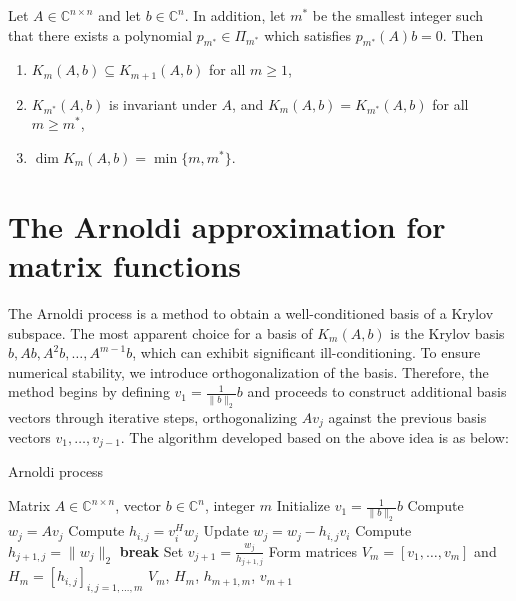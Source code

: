 \begin{remark}
    \label{rem:2.14}
    \cite{37} Let $A \in \mathbb{C}^{n \times n}$ and let $b \in \mathbb{C}^n$. In addition, let $m^*$ be the smallest integer such that there exists a polynomial $p_{m^*} \in \Pi_{m^*}$ which satisfies $p_{m^*}(A)b = 0$. Then
    \begin{enumerate}
        \item $K_m(A,b) \subseteq K_{m+1}(A,b)$ for all $m \geq 1$,
        \item $K_{m^*}(A,b)$ is invariant under $A$, and $K_m(A,b) = K_{m^*}(A,b)$ for all $m \geq m^*$,
        \item $\dim K_m(A,b) = \min\{m, m^*\}$.
    \end{enumerate}

\end{remark}

\section{The Arnoldi approximation for matrix functions}
\label{sec:arnoldi}

The Arnoldi process is a method to obtain a well-conditioned basis of a Krylov subspace. The most apparent choice for a basis of $K_m(A,b)$ is the Krylov basis $b, Ab, A^2b, \ldots, A^{m-1}b$, which can exhibit significant ill-conditioning. To ensure numerical stability, we introduce orthogonalization of the basis. Therefore, the method begins by defining $v_1 = \frac{1}{\|b\|_2} b$ and proceeds to construct additional basis vectors through iterative steps, orthogonalizing $Av_j$ against the previous basis vectors $v_1, \ldots, v_{j-1}$. The algorithm developed based on the above idea is as below:

\begin{algorithm}[H]
    \caption{Arnoldi process \cite{38}}
    \label{alg:arnoldi}
    \begin{algorithmic}[1] %
        \REQUIRE Matrix $A \in \mathbb{C}^{n \times n}$, vector $b \in \mathbb{C}^n$, integer $m$
        \STATE Initialize $v_1 = \frac{1}{\|b\|_2} b$
            \STATE Compute $w_j = A v_j$
                \STATE Compute $h_{i,j} = v_i^H w_j$
                \STATE Update $w_j = w_j - h_{i,j} v_i$
            \ENDFOR
            \STATE Compute $h_{j+1,j} = \|w_j\|_2$
                \STATE \textbf{break}
            \ENDIF
            \STATE Set $v_{j+1} = \frac{w_j}{h_{j+1,j}}$
        \ENDFOR
        \STATE Form matrices $V_m = [v_1, \ldots, v_m]$ and $H_m = [h_{i,j}]_{i,j=1,\ldots,m}$
        \RETURN $V_m$, $H_m$, $h_{m+1,m}$, $v_{m+1}$
    \end{algorithmic}
\end{algorithm}

